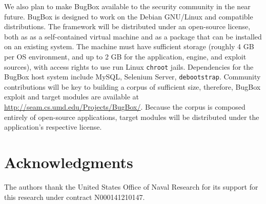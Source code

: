 \documentclass[letterpaper,twocolumn,10pt]{article}
\begin{document}
We also plan to make BugBox available to the security community in the near future. BugBox is designed to work on the Debian GNU/Linux and compatible distributions.  The framework will be distributed under an open-source license, both as as a self-contained virtual machine and as a package that can be installed on an existing system. The machine must have sufficient storage (roughly 4 GB per OS environment, and up to 2 GB for the application, engine, and exploit sources), with access rights to use run Linux {\tt chroot} jails.  Dependencies for the BugBox host system include MySQL, Selenium Server, \texttt{debootstrap}. Community contributions will be key to building a corpus of sufficient size, therefore, BugBox exploit and target modules are available at \url{http://seam.cs.umd.edu/Projects/BugBox/}. Because the corpus is composed entirely of open-source applications, target modules will be distributed under the application's respective license.

\section*{Acknowledgments}

The authors thank the United States Office of Naval Research for its support for this research under contract N000141210147.

{\footnotesize 
}
\end{document}
